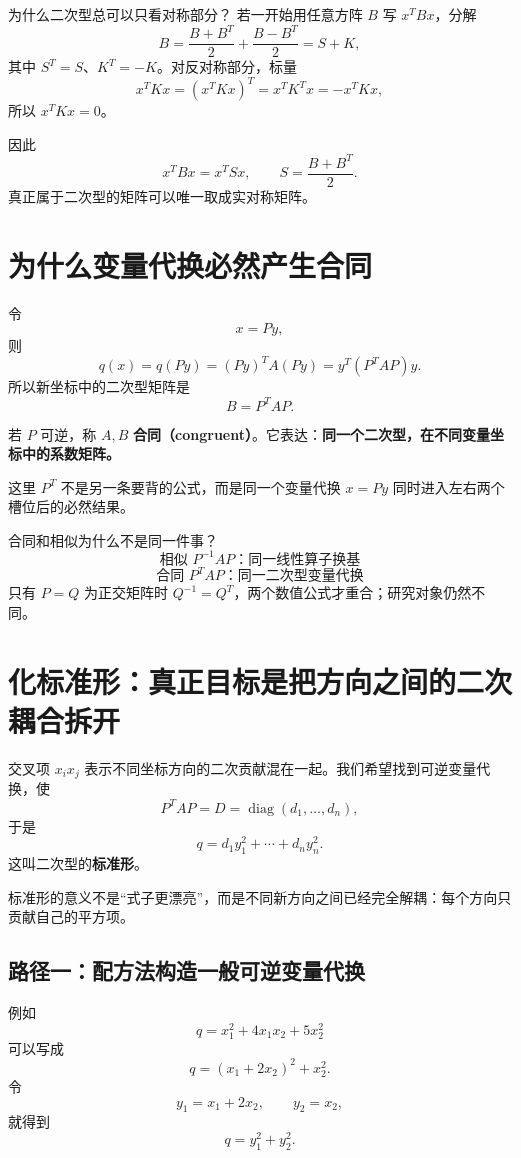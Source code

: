 \documentclass[11pt,a4paper]{ctexart}
\newcommand{\kw}[1]{\textbf{\color{deep}#1}}
\begin{document}
\begin{warnbox}{为什么二次型总可以只看对称部分？}
若一开始用任意方阵 $B$ 写 $x^TBx$，分解
\[
B=\frac{B+B^T}{2}+\frac{B-B^T}{2}=S+K,
\]
其中 $S^T=S$、$K^T=-K$。对反对称部分，标量
\[
x^TKx=(x^TKx)^T=x^TK^Tx=-x^TKx,
\]
所以 $x^TKx=0$。

因此
\[
\boxed{x^TBx=x^TSx,\qquad S=\frac{B+B^T}{2}.}
\]
真正属于二次型的矩阵可以唯一取成实对称矩阵。
\end{warnbox}

\section{为什么变量代换必然产生合同}

令
\[
x=Py,
\]
则
\[
q(x)=q(Py)
=(Py)^TA(Py)
=y^T(P^TAP)y.
\]
所以新坐标中的二次型矩阵是
\[
\boxed{B=P^TAP.}
\]

若 $P$ 可逆，称 $A,B$ \kw{合同（congruent）}。它表达：\kw{同一个二次型，在不同变量坐标中的系数矩阵。}

这里 $P^T$ 不是另一条要背的公式，而是同一个变量代换 $x=Py$ 同时进入左右两个槽位后的必然结果。

\begin{corebox}{合同和相似为什么不是同一件事？}
\[
\boxed{\text{相似 }P^{-1}AP\text{：同一线性算子换基}}
\]
\[
\boxed{\text{合同 }P^TAP\text{：同一二次型变量代换}}
\]
只有 $P=Q$ 为正交矩阵时 $Q^{-1}=Q^T$，两个数值公式才重合；研究对象仍然不同。
\end{corebox}

\section{化标准形：真正目标是把方向之间的二次耦合拆开}

交叉项 $x_ix_j$ 表示不同坐标方向的二次贡献混在一起。我们希望找到可逆变量代换，使
\[
P^TAP=D=\operatorname{diag}(d_1,\dots,d_n),
\]
于是
\[
q=d_1y_1^2+\cdots+d_ny_n^2.
\]
这叫二次型的\kw{标准形}。

标准形的意义不是“式子更漂亮”，而是不同新方向之间已经完全解耦：每个方向只贡献自己的平方项。

\subsection{路径一：配方法构造一般可逆变量代换}

例如
\[
q=x_1^2+4x_1x_2+5x_2^2
\]
可以写成
\[
q=(x_1+2x_2)^2+x_2^2.
\]
令
\[
y_1=x_1+2x_2,
\qquad y_2=x_2,
\]
就得到
\[
q=y_1^2+y_2^2.
\]
\end{document}
